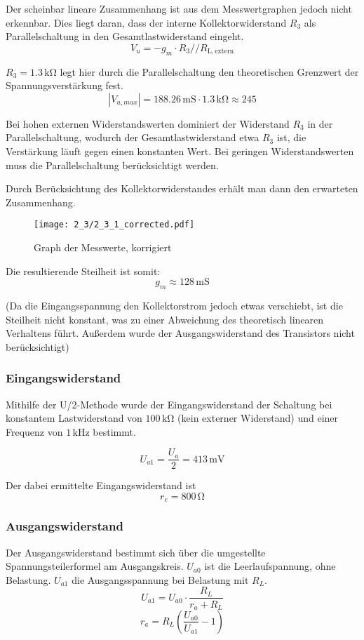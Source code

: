 Der scheinbar lineare Zusammenhang ist aus dem Messwertgraphen jedoch nicht
erkennbar. Dies liegt daran, dass der interne Kollektorwiderstand $R_3$ als
Parallelschaltung in den Gesamtlastwiderstand eingeht.
\[V_u = -g_m \cdot R_3 // R_{\mathrm{L,extern}}\]

$R_3 = 1.3 \, \si{\kilo\ohm}$ legt hier durch die Parallelschaltung den
theoretischen Grenzwert der Spannungsverstärkung fest. \[|V_{u,max}| = 188.26 \,
  \si{\milli\siemens} \cdot 1.3 \, \si{\kilo\ohm} \approx 245\]


Bei hohen externen Widerstandswerten dominiert der Widerstand $R_3$ in der
Parallelschaltung, wodurch der Gesamtlastwiderstand etwa $R_3$ ist, die
Verstärkung läuft gegen einen konstanten Wert.
Bei geringen Widerstandswerten muss die Parallelschaltung berücksichtigt
werden.

Durch Berücksichtung des Kollektorwiderstandes erhält man dann den erwarteten Zusammenhang.

\begin{figure}[H]
  \begin{center}
    \texttt{[image: 2\_3/2\_3\_1\_corrected.pdf]}
  \end{center}
  \caption{Graph der Messwerte, korrigiert}
\end{figure}

Die resultierende Steilheit ist somit:
\[g_m \approx 128 \, \si{\milli\siemens}\]


(Da die Eingangsspannung den Kollektorstrom jedoch etwas verschiebt, ist die
Steilheit nicht konstant, was zu einer Abweichung des theoretisch linearen
Verhaltens führt. Außerdem wurde der Ausgangswiderstand des Transistors nicht berücksichtigt)

\subsubsection{Eingangswiderstand}
Mithilfe der U/2-Methode wurde der Eingangswiderstand der Schaltung bei
konstantem Lastwiderstand von $100 \, \si{\kilo\ohm}$ (kein externer Widerstand)
und einer Frequenz von $1 \, \si{\kilo\hertz}$ bestimmt.

\[U_{a1} = \frac{U_a}{2} = 413 \, \si{\milli\volt}\]

Der dabei ermittelte Eingangswiderstand ist
\[r_e = 800 \, \si{\ohm}\]

\subsubsection{Ausgangswiderstand}
Der Ausgangswiderstand bestimmt sich über die umgestellte Spannungsteilerformel
am Ausgangskreis. $U_{a0}$ ist die Leerlaufspannung, ohne Belastung. $U_{a1}$
die Ausgangsspannung bei Belastung mit $R_L$.
\[U_{a1} = U_{a0} \cdot \frac{R_L}{r_a + R_L}\]
\[r_a = R_L \left( \frac{U_{a0}}{U_{a1}} -1 \right)\]

